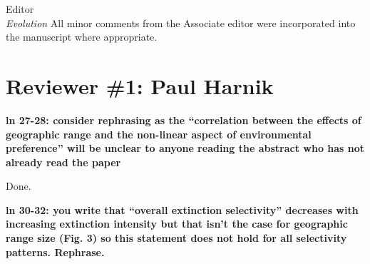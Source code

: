 \documentclass{letter}
\begin{document}
\begin{letter}{Editor \\ \textit{Evolution}}
  All minor comments from the Associate editor were incorporated into the manuscript where appropriate.
 
  \section{Reviewer \#1: Paul Harnik}


  \textbf{ln 27-28: consider rephrasing as the “correlation between the effects of geographic range and the non-linear aspect of environmental preference” will be unclear to anyone reading the abstract who has not already read the paper}

  Done.

  \textbf{ln 30-32: you write that “overall extinction selectivity” decreases with increasing extinction intensity but that isn’t the case for geographic range size (Fig. 3) so this statement does not hold for all selectivity patterns. Rephrase.}


\end{letter}
\end{document}

